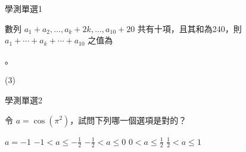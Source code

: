\begin{QUESTIONS}
    \begin{QUESTION}
        \begin{ExamInfo}{98}{學測}{單選}{1}
        \end{ExamInfo}
        \begin{ExamAnsRateInfo}{85}{99}{95}{61}
        \end{ExamAnsRateInfo}
        \begin{QBODY}
            數列 $a_1 + a_2, \dots ,a_k +2k , \dots , a_{10} +20$ 共有十項，且其和為240，則 $a_1 + \cdots +a_k + \cdots +a_{10}$ 之值為 
			\begin{QOPS} 
				 。
			\end{QOPS}
        \end{QBODY}
        \begin{QFROMS}
        \end{QFROMS}
        \begin{QTAGS}\end{QTAGS}
        \begin{QANS}
            (3)
        \end{QANS}
        \begin{QSOLLIST}
        \end{QSOLLIST}
        \begin{QEMPTYSPACE}
        \end{QEMPTYSPACE}
    \end{QUESTION}
    \begin{QUESTION}
        \begin{ExamInfo}{98}{學測}{單選}{2}
        \end{ExamInfo}
        \begin{ExamAnsRateInfo}{23}{36}{18}{15}
        \end{ExamAnsRateInfo}
        \begin{QBODY}
            令 $a = \cos (\pi^2 )$，試問下列哪一個選項是對的？
			\begin{QOPS} 
				\QOP $a= -1$
				\QOP $-1< a \leq -\frac{1}{2}$
				\QOP $-\frac{1}{2} < a \leq 0$ 
				\QOP $0 < a \leq \frac{1}{2}$ 
				\QOP $\frac{1}{2} < a \leq 1 $
			\end{QOPS}
        \end{QBODY}
        \begin{QFROMS}
        \end{QFROMS}
        \begin{QTAGS}\end{QTAGS}

\end{QUESTION}
\end{QUESTIONS}
